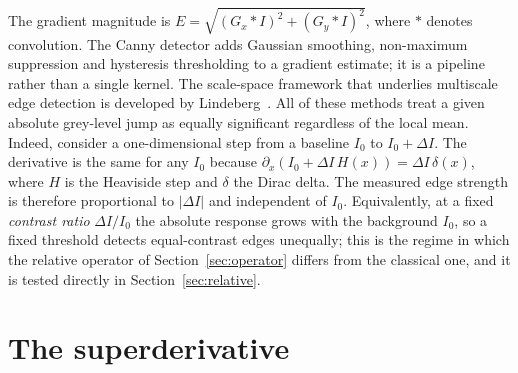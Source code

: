 \documentclass[conference]{IEEEtran}
\begin{document}
The gradient magnitude is $E=\sqrt{(G_x*I)^2+(G_y*I)^2}$, where $*$ denotes
convolution.  The Canny detector adds Gaussian smoothing, non-maximum
suppression and hysteresis thresholding to a gradient estimate; it is a
pipeline rather than a single kernel\cite{canny}.  The scale-space framework
that underlies multiscale edge detection is developed by
Lindeberg~\cite{lindeberg1994}.  All of these methods treat
a given absolute grey-level jump as equally significant regardless of the
local mean.  Indeed, consider a one-dimensional step from a baseline $I_0$ to
$I_0+\Delta I$.  The derivative is the same for any $I_0$ because
$\partial_x(I_0+\Delta I\,H(x))=\Delta I\,\delta(x)$, where $H$ is the
Heaviside step and $\delta$ the Dirac delta.  The measured edge strength is
therefore proportional to $|\Delta I|$ and independent of $I_0$.  Equivalently, at a
fixed \emph{contrast ratio} $\Delta I/I_0$ the absolute response grows with the
background $I_0$, so a fixed threshold detects equal-contrast edges unequally; this
is the regime in which the relative operator of Section~\ref{sec:operator}
differs from the classical one, and it is tested directly in
Section~\ref{sec:relative}.

\section{The superderivative}
\label{sec:superderiv}
\end{document}
